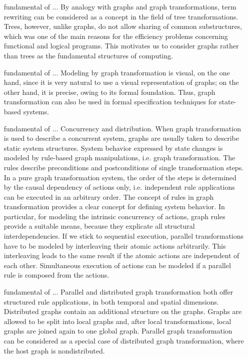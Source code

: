  
\newpage
\begin{itemize}
    \item[fundamental of ...] By analogy with graphs and graph transformations, term rewriting can be considered as a concept in the field of tree transformations. Trees, however, unlike graphs, do not allow sharing of common substructures, which was one of the main reasons for the efficiency problems concerning functional and logical programs. This motivates us to consider graphs rather than trees as the fundamental structures of computing.
    \item[fundamental of ...]   Modeling by graph transformation is visual, on the one hand, since it is very natural to use a visual representation of graphs; on the other hand, it is precise, owing to its formal foundation. Thus, graph transformation can also be used in formal specification techniques for state-based systems.
    \item[fundamental of ...] Concurrency and distribution. When graph transformation is used to describe a concurrent system, graphs are usually taken to describe static system structures. System behavior expressed by state changes is modeled by rule-based graph manipulations, i.e. graph transformation. The rules describe preconditions and postconditions of single transformation steps. In a pure graph transformation system, the order of the steps is determined by the causal dependency of actions only, i.e. independent rule applications can be executed in an arbitrary order. The concept of rules in graph transformation provides a clear concept for defining system behavior. In particular, for modeling the intrinsic concurrency of actions, graph rules provide a suitable means, because they explicate all structural interdependencies. If we stick to sequential execution, parallel transformations have to be modeled by interleaving their atomic actions arbitrarily. This interleaving leads to the same result if the atomic actions are independent of each other. Simultaneous execution of actions can be modeled if a parallel rule is composed from the actions.
    \item[fundamental of ...] Parallel and distributed graph transformation both offer structured rule applications, in both temporal and spatial dimensions. Distributed graphs contain an additional structure on the graphs. Graphs are allowed to be split into local graphs and, after local transformations, local graphs are joined again to one global graph. Parallel graph transformation can be considered as a special case of distributed graph transformation, where the host graph is nondistributed.

\end{itemize}
